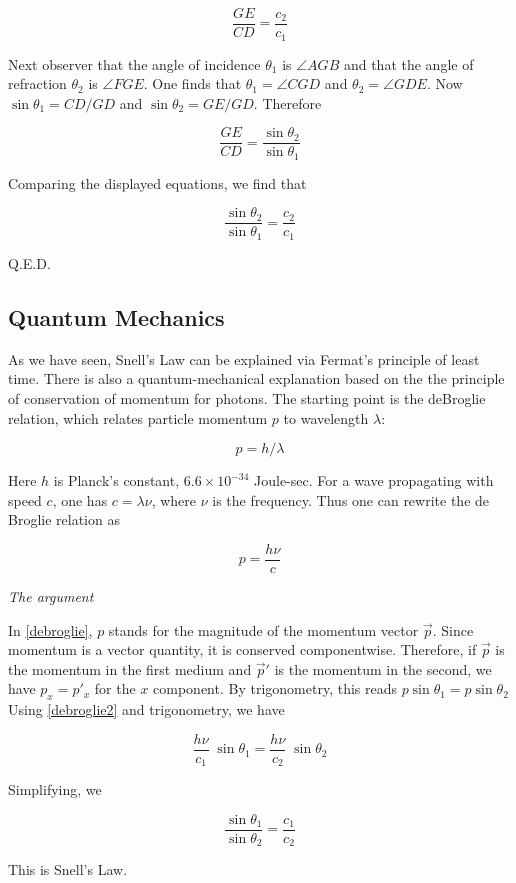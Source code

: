 \begin{equation}
\frac{GE}{CD} = \frac{c_2}{c_1}
\end{equation}

Next observer that the angle of incidence $\theta_1$ is $\angle AGB$ and that the angle of refraction $\theta_2$ is $\angle FGE$. One finds that $\theta_1 = \angle CGD$ and $\theta_2 = \angle GDE$.  Now $\sin \theta_1 = CD/GD$ and $\sin\theta_2 = GE/GD$.  Therefore

\begin{equation}
\frac{GE}{CD} = \frac{\sin\theta_2}{\sin\theta_1}
\end{equation}

Comparing the displayed equations, we find that

\begin{equation}
\frac{\sin\theta_2}{\sin\theta_1} = \frac{c_2}{c_1}
\end{equation}

Q.E.D.


\subsection{Quantum Mechanics}

As we have seen, Snell's Law can be explained via Fermat's principle of least time.  There is also a quantum-mechanical explanation based on the the principle of conservation of momentum for photons.
The starting point is the deBroglie relation, which relates particle momentum $p$ to wavelength $\lambda$:

\begin{equation}
\label{debroglie}
p = h/\lambda
\end{equation}

Here $h$ is Planck's constant, $6.6\times 10^{-34}$ Joule-sec.  For a wave propagating with speed $c$, one has $c = \lambda\nu$, where $\nu$ is the frequency.  Thus one can rewrite the de Broglie relation as

\begin{equation}
\label{debroglie2}
  p = \frac{h\nu}{c}
\end{equation}


\emph{The argument}

In \eqref{debroglie}, $p$ stands for the magnitude of the momentum vector
$\vec p$. Since momentum is a vector quantity, it is
conserved componentwise.  Therefore, if $\vec p$ is the
momentum in the first medium and $\vec p'$  is
the momentum in the second, we have $p_x = p'_x$ for the
$x$ component. By trigonometry, this reads $p\sin\theta_1 = p\sin\theta_2$  Using \eqref{debroglie2} and trigonometry, we
have

\begin{equation}
\frac{h\nu}{c_1}\;\sin \theta_1
=
\frac{h \nu}{c_2}\;\sin \theta_2
\end{equation}

Simplifying, we

\begin{equation}
\frac{\sin \theta_1}{\sin \theta_2}
=
\frac{c_1}{c_2}
\end{equation}

This is Snell's Law.

